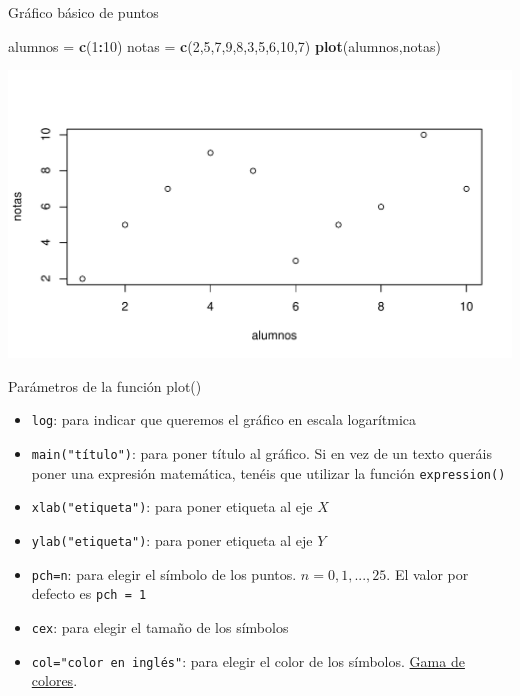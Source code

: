 \documentclass[
  ignorenonframetext,
]{beamer}
\newenvironment{Shaded}{\begin{snugshade}}{\end{snugshade}}
\newcommand{\DecValTok}[1]{\textcolor[rgb]{0.00,0.00,0.81}{#1}}
\newcommand{\FunctionTok}[1]{\textcolor[rgb]{0.13,0.29,0.53}{\textbf{#1}}}
\newcommand{\NormalTok}[1]{#1}
\newcommand{\OtherTok}[1]{\textcolor[rgb]{0.56,0.35,0.01}{#1}}
\newcommand{\SpecialCharTok}[1]{\textcolor[rgb]{0.81,0.36,0.00}{\textbf{#1}}}
\providecommand{\tightlist}{%
  \setlength{\itemsep}{0pt}\setlength{\parskip}{0pt}}
\begin{document}
\begin{frame}[fragile]{Gráfico básico de puntos}
\label{gruxe1fico-buxe1sico-de-puntos-1}
\begin{Shaded}
\begin{Highlighting}[]
\NormalTok{alumnos }\OtherTok{=} \FunctionTok{c}\NormalTok{(}\DecValTok{1}\SpecialCharTok{:}\DecValTok{10}\NormalTok{)}
\NormalTok{notas }\OtherTok{=} \FunctionTok{c}\NormalTok{(}\DecValTok{2}\NormalTok{,}\DecValTok{5}\NormalTok{,}\DecValTok{7}\NormalTok{,}\DecValTok{9}\NormalTok{,}\DecValTok{8}\NormalTok{,}\DecValTok{3}\NormalTok{,}\DecValTok{5}\NormalTok{,}\DecValTok{6}\NormalTok{,}\DecValTok{10}\NormalTok{,}\DecValTok{7}\NormalTok{)}
\FunctionTok{plot}\NormalTok{(alumnos,notas)}
\end{Highlighting}
\end{Shaded}

\begin{center}\includegraphics[width=0.8\linewidth]{R_base_files/figure-beamer/unnamed-chunk-35-1} \end{center}
\end{frame}

\begin{frame}[fragile]{Parámetros de la función plot()}
\label{paruxe1metros-de-la-funciuxf3n-plot}
\begin{itemize}
\tightlist
\item
  \texttt{log}: para indicar que queremos el gráfico en escala
  logarítmica
\item
  \texttt{main("título")}: para poner título al gráfico. Si en vez de un
  texto queráis poner una expresión matemática, tenéis que utilizar la
  función \texttt{expression()}
\item
  \texttt{xlab("etiqueta")}: para poner etiqueta al eje \(X\)
\item
  \texttt{ylab("etiqueta")}: para poner etiqueta al eje \(Y\)
\item
  \texttt{pch=n}: para elegir el símbolo de los puntos.
  \(n=0,1,...,25\). El valor por defecto es \texttt{pch\ =\ 1}
\item
  \texttt{cex}: para elegir el tamaño de los símbolos
\item
  \texttt{col="color\ en\ inglés"}: para elegir el color de los
  símbolos.
  \href{http://www.stat.columbia.edu/~tzheng/files/Rcolor.pdf}{Gama de
  colores}.
\end{itemize}
\end{frame}
\end{document}
